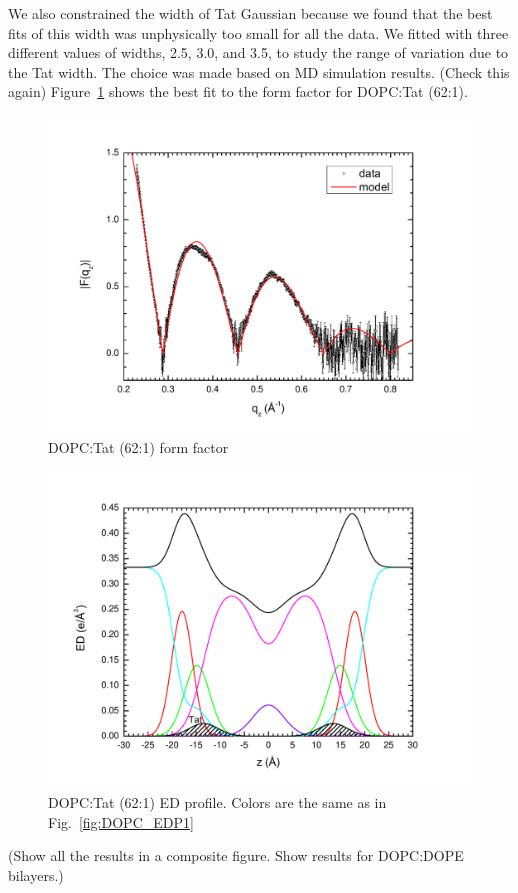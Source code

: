 We also constrained the width of Tat 
Gaussian because we found that the best fits of this width was  
unphysically too small for all the data. 
We fitted with three different values of widths,
2.5, 3.0, and 3.5, to study the range of variation due to the Tat width. 
The choice was made based on MD simulation results. (Check this again)
Figure~\ref{fig:DOPC_Tat_62to1_3.0_XFF1} shows the best fit to the 
form factor for DOPC:Tat (62:1). 
\begin{figure}[htbp]
  \centering
  \includegraphics[scale=0.3]{./figures/Tat/SDP_Results/DOPC_Tat_62to1_3_XFF1.pdf}
  \caption{DOPC:Tat (62:1) form factor}
  \label{fig:DOPC_Tat_62to1_3.0_XFF1}
\end{figure}
\begin{figure}[htbp]
  \centering
  \includegraphics[scale=0.3]{./figures/Tat/SDP_Results/DOPC_Tat_62to1_3_EDP1.pdf}
  \caption{DOPC:Tat (62:1) ED profile. Colors are the same as in 
  Fig.~\ref{fig:DOPC_EDP1}}
  \label{fig:DOPC_Tat_62to1_3.0_EDP1}
\end{figure}
(Show all the results in a composite figure. Show results for DOPC:DOPE bilayers.)

